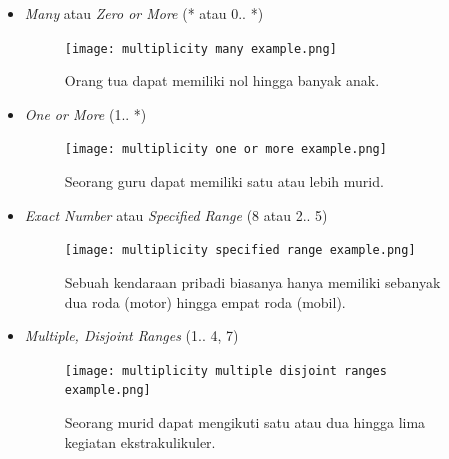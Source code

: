 \documentclass[a4paper]{article}
\begin{document}
\begin{enumerate}
\begin{itemize}
\begin{figure}[h]
        \end{figure}
        \item \textit{Many} atau \textit{Zero or More} (* atau 0.. *)\\
        \begin{figure}[h]
            \centering
            \texttt{[image: multiplicity many example.png]}\\
            \caption{Orang tua dapat memiliki nol hingga banyak anak.}
        \end{figure}
        \item \textit{One or More} (1.. *)\\
        \begin{figure}[h]
            \centering
            \texttt{[image: multiplicity one or more example.png]}\\
            \caption{Seorang guru dapat memiliki satu atau lebih murid.}
        \end{figure}
        
        \item \textit{Exact Number} atau \textit{Specified Range} (8 atau 2.. 5)\\
        \begin{figure}[h]
            \centering
            \texttt{[image: multiplicity specified range example.png]}\\
            \caption{Sebuah kendaraan pribadi biasanya hanya memiliki sebanyak dua roda (motor) hingga empat roda (mobil).}
        \end{figure}
        \newpage
        \item \textit{Multiple, Disjoint Ranges} (1.. 4, 7)\\
        \begin{figure}[h]
            \centering
            \texttt{[image: multiplicity multiple disjoint ranges example.png]}\\
            \caption{Seorang murid dapat mengikuti satu atau dua hingga lima kegiatan ekstrakulikuler.}
        \end{figure}
    \end{itemize}
    

\end{enumerate}
\end{document}
